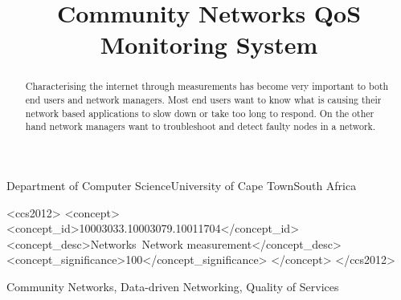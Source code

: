 \documentclass[plain]{sigplanconf}
\begin{document}
	\title{Community Networks QoS Monitoring System}

	{Department of Computer Science\linebreak University of Cape Town\linebreak South Africa}
	{}
	\maketitle
	\begin{abstract}
	\paragraph{}
	Characterising the internet through measurements has
	become very important to both end users and network
	managers. Most end users want to know what is causing their network based applications to slow down or take too long to respond. On the other hand network managers want to troubleshoot and detect faulty nodes in a network.
	\paragraph{}
	
	\end{abstract}
	\begin{CCSXML}
		<ccs2012>
		<concept>
		<concept_id>10003033.10003079.10011704</concept_id>
		<concept_desc>Networks~Network measurement</concept_desc>
		<concept_significance>100</concept_significance>
		</concept>
		</ccs2012>
	\end{CCSXML}
	\keywords
	Community Networks, Data-driven Networking, Quality of Services
	








	
	
%	
\end{document}
